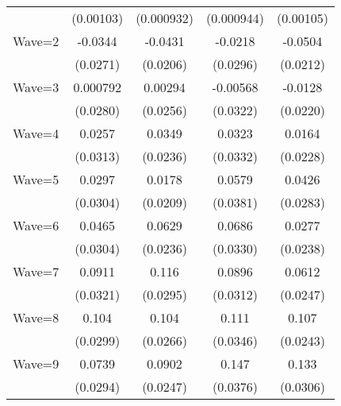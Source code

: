{\begin{tabular}{l*{4}{c}}
                    &   (0.00103)         &  (0.000932)         &  (0.000944)         &   (0.00105)         \\
[1em]
Wave=2              &     -0.0344         &     -0.0431\sym{*}  &     -0.0218         &     -0.0504\sym{*}  \\
                    &    (0.0271)         &    (0.0206)         &    (0.0296)         &    (0.0212)         \\
[1em]
Wave=3              &    0.000792         &     0.00294         &    -0.00568         &     -0.0128         \\
                    &    (0.0280)         &    (0.0256)         &    (0.0322)         &    (0.0220)         \\
[1em]
Wave=4              &      0.0257         &      0.0349         &      0.0323         &      0.0164         \\
                    &    (0.0313)         &    (0.0236)         &    (0.0332)         &    (0.0228)         \\
[1em]
Wave=5              &      0.0297         &      0.0178         &      0.0579         &      0.0426         \\
                    &    (0.0304)         &    (0.0209)         &    (0.0381)         &    (0.0283)         \\
[1em]
Wave=6              &      0.0465         &      0.0629\sym{**} &      0.0686\sym{*}  &      0.0277         \\
                    &    (0.0304)         &    (0.0236)         &    (0.0330)         &    (0.0238)         \\
[1em]
Wave=7              &      0.0911\sym{**} &       0.116\sym{***}&      0.0896\sym{**} &      0.0612\sym{*}  \\
                    &    (0.0321)         &    (0.0295)         &    (0.0312)         &    (0.0247)         \\
[1em]
Wave=8              &       0.104\sym{***}&       0.104\sym{***}&       0.111\sym{**} &       0.107\sym{***}\\
                    &    (0.0299)         &    (0.0266)         &    (0.0346)         &    (0.0243)         \\
[1em]
Wave=9              &      0.0739\sym{*}  &      0.0902\sym{***}&       0.147\sym{***}&       0.133\sym{***}\\
                    &    (0.0294)         &    (0.0247)         &    (0.0376)         &    (0.0306)         \\

\end{tabular}}
